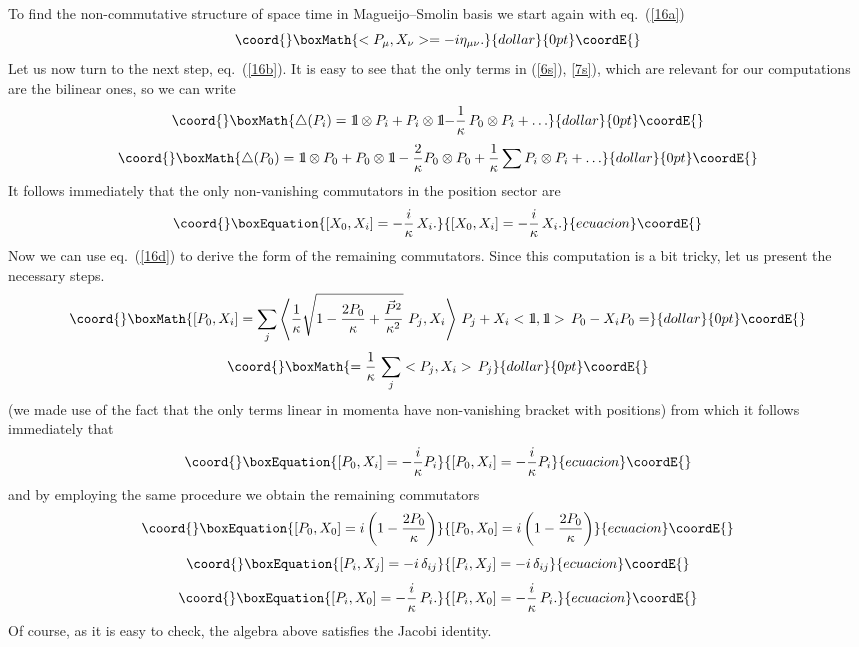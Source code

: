 \documentclass[a4paper,a4paper]{article}
\def\bbbone{{\mathchoice {\rm 1\mskip-4mu l} {\rm 1\mskip-4mu l}
{\rm 1\mskip-4.5mu l} {\rm 1\mskip-5mu l}}}
\begin{document}
To find the non-commutative structure of space time in Magueijo--Smolin basis we start again with eq.~(\ref{16a})
$$\coord{}\boxMath{
 <P_\mu, X_\nu> =  -i \eta_{\mu\nu}.
}{dollar}{0pt}\coordE{}$$
Let us now turn to the next step, eq.~(\ref{16b}). It is easy to
see that the only terms in (\ref{6s}), \ref{7s}),  which are
relevant for our computations are the bilinear ones, so we can
write
$$\coord{}\boxMath{
  \triangle(P_{i})=\bbbone \otimes P_{i} + P_{i} \otimes \bbbone {-\frac{1}{\kappa}}\, P_{0} \otimes P_{i} + \ldots
}{dollar}{0pt}\coordE{}$$  $$\coord{}\boxMath{
  \triangle(P_{0})= \bbbone \otimes P_{0} + P_{0} \otimes \bbbone -
  \frac{2}{\kappa}P_{0} \otimes P_{0} +  \frac{1}{\kappa}\sum P_{i}\otimes P_{i}+ \ldots
}{dollar}{0pt}\coordE{}$$
It follows immediately that the only non-vanishing commutators in the position sector are
\begin{equation}\coord{}\boxEquation{\label{18}
  [X_0, X_i] = -\frac{i}\kappa\, X_i.
}{[X_0, X_i] = -\frac{i}\kappa\, X_i.
}{ecuacion}\coordE{}\end{equation}
Now we can use eq.~(\ref{16d}) to derive the form of the remaining
commutators. Since this computation is a bit tricky, let us
present the necessary steps.
$$\coord{}\boxMath{
[P_0, X_i] = \sum_j \left<\frac{1}{\kappa} \sqrt{1 -
\frac{2P_{0}}{\kappa} +
   \frac{\vec{P}^{2}}{\kappa^{2}}} \,\,  P_{j}, X_i\right>\, P_j   +
X_i <\bbbone, \bbbone>\, P_0 - X_i P_0 =
}{dollar}{0pt}\coordE{}$$  $$\coord{}\boxMath{
=\frac{1}{\kappa}\,\sum_j <P_{j}, X_i>\, P_j
}{dollar}{0pt}\coordE{}$$
(we made use of the fact that the only terms linear in momenta
have non-vanishing bracket with positions) from which it follows
immediately that
\begin{equation}\coord{}\boxEquation{\label{19b}
 [P_0, X_i] =  -\frac{i}\kappa P_i
}{[P_0, X_i] =  -\frac{i}\kappa P_i
}{ecuacion}\coordE{}\end{equation}
and by employing the same procedure we obtain the remaining
commutators
\begin{equation}\coord{}\boxEquation{\label{19a}
 [P_0, X_0] = i\left(1 - \frac{2P_0}\kappa \right)
}{[P_0, X_0] = i\left(1 - \frac{2P_0}\kappa \right)
}{ecuacion}\coordE{}\end{equation}
\begin{equation}\coord{}\boxEquation{\label{19c}
  [P_i, X_j] = -i \, \delta_{ij}
}{[P_i, X_j] = -i \, \delta_{ij}
}{ecuacion}\coordE{}\end{equation}
\begin{equation}\coord{}\boxEquation{\label{19d}
 [P_i, X_0] = -\frac{i}\kappa\, P_i.
}{[P_i, X_0] = -\frac{i}\kappa\, P_i.
}{ecuacion}\coordE{}\end{equation}
Of course, as it is easy to check, the algebra above satisfies the
Jacobi identity.
\end{document}

